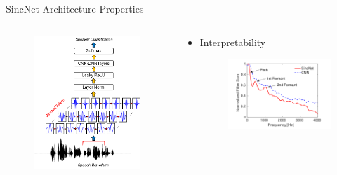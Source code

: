 \documentclass[11pt]{beamer}
\begin{document}
\begin{frame}{SincNet Architecture Properties}
	\begin{columns}
		\begin{column}{0.47\textwidth}
			\begin{figure}[H]
				\includegraphics[width=0.9\linewidth]{images/SincNet.png}
			\end{figure}
		\end{column}
		\begin{column}{0.5\textwidth}
			\begin{itemize}
				\item Interpretability
				\begin{figure}[H]
					\includegraphics[width=0.9\linewidth]{images/interpretability.png}
				\end{figure}
			\end{itemize}
		\end{column}
	\end{columns}
\end{frame}
\end{document}
